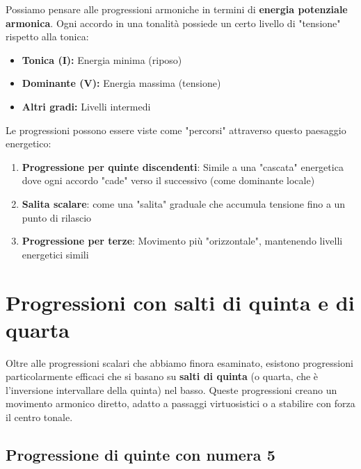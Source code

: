 \begin{fisica}
	Possiamo pensare alle progressioni armoniche in termini di \textbf{energia potenziale armonica}. Ogni accordo in una tonalità possiede un certo livello di "tensione" rispetto alla tonica:
	
	\begin{itemize}
		\item \textbf{Tonica (I):} Energia minima (riposo)
		\item \textbf{Dominante (V):} Energia massima (tensione)
		\item \textbf{Altri gradi:} Livelli intermedi
	\end{itemize}
	
	Le progressioni possono essere viste come "percorsi" attraverso questo paesaggio energetico:
	
	\begin{enumerate}
		\item \textbf{Progressione per quinte discendenti}: Simile a una "cascata" energetica dove ogni accordo "cade" verso il successivo (come dominante locale)
		
		\item \textbf{Salita scalare}: come una "salita" graduale che accumula tensione fino a un punto di rilascio
		
		\item \textbf{Progressione per terze}: Movimento più "orizzontale", mantenendo livelli energetici simili
	\end{enumerate}
	
\end{fisica}

\section{Progressioni con salti di quinta e di quarta}
\label{sec:progressioni_salti_quinta}

Oltre alle progressioni scalari che abbiamo finora esaminato, esistono progressioni particolarmente efficaci che si basano su \textbf{salti di quinta} (o quarta, che è l'inversione intervallare della quinta) nel basso. Queste progressioni creano un movimento armonico diretto, adatto a passaggi virtuosistici o a stabilire con forza il centro tonale.

\subsection{Progressione di quinte con numera 5}
\label{subsec:progressione_quinte_5}

